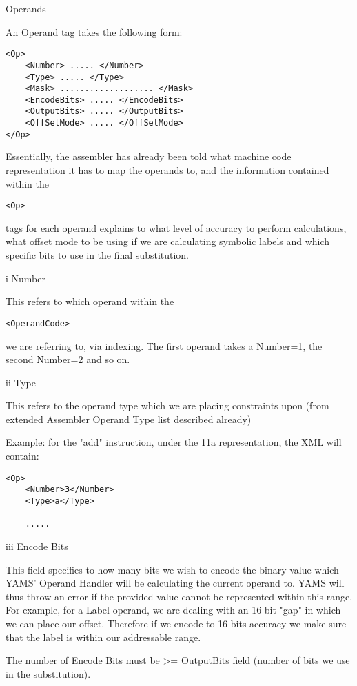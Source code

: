 \documentclass[12pt]{report}
\begin{document}
\begin{enumerate}
Operands

An Operand tag takes the following form:

\begin{verbatim}
<Op>
	<Number> ..... </Number>
	<Type> ..... </Type>
	<Mask> ................... </Mask>
	<EncodeBits> ..... </EncodeBits>
	<OutputBits> ..... </OutputBits>
	<OffSetMode> ..... </OffSetMode>
</Op>
\end{verbatim}

Essentially, the assembler has already been told what machine code representation it has to map the operands to, and the information contained within the \begin{verbatim}<Op>\end{verbatim} tags for each operand explains to what level of accuracy to perform calculations, what offset mode to be using if we are calculating symbolic labels and which specific bits to use in the final substitution.

i	Number

This refers to which operand within the \begin{verbatim}<OperandCode>\end{verbatim} we are referring to, via indexing. The first operand takes a Number=1, the second Number=2 and so on.

ii	Type

This refers to the operand type which we are placing constraints upon (from extended Assembler Operand Type list described already)


Example: for the "add" instruction, under the 11a representation, the XML will contain:

\begin{verbatim}
<Op>
	<Number>3</Number>
	<Type>a</Type>

	.....
\end{verbatim}

iii	Encode Bits

This field specifies to how many bits we wish to encode the binary value which YAMS' Operand Handler will be calculating the current operand to.
YAMS will thus throw an error if the provided value cannot be represented within this range. For example, for a Label operand, we are dealing with an 16 bit "gap" in which we can place our offset. Therefore if we encode to 16 bits accuracy we make sure that the label is within our addressable range.

The number of Encode Bits must be >= OutputBits field (number of bits we use in the substitution).


\end{enumerate}
\end{document}
